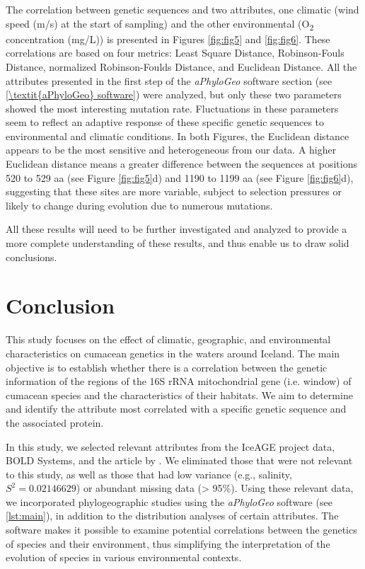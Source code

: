 The correlation between genetic sequences and two attributes, one climatic (wind speed (m/s) at the start of sampling) and the other environmental (O\textsubscript{2} concentration (mg/L)) is presented in Figures \ref{fig:fig5} and \ref{fig:fig6}. These correlations are based on four metrics: Least Square Distance, Robinson-Fouls Distance, normalized Robinson-Foulds Distance, and Euclidean Distance. All the attributes presented in the first step of the \textit{aPhyloGeo} software section (see \ref{\textit{aPhyloGeo} software}) were analyzed, but only these two parameters showed the most interesting mutation rate. Fluctuations in these parameters seem to reflect an adaptive response of these specific genetic sequences to environmental and climatic conditions. In both Figures, the Euclidean distance appears to be the most sensitive and heterogeneous from our data. A higher Euclidean distance means a greater difference between the sequences at positions 520 to 529 aa (see Figure \ref{fig:fig5}d) and 1190 to 1199 aa (see Figure \ref{fig:fig6}d), suggesting that these sites are more variable, subject to selection pressures or likely to change during evolution due to numerous mutations. 

All these results will need to be further investigated and analyzed to provide a more complete understanding of these results, and thus enable us to draw solid conclusions.

\section{Conclusion}\label{conclusion}

This study focuses on the effect of climatic, geographic, and environmental characteristics on cumacean genetics in the waters around Iceland. The main objective is to establish whether there is a correlation between the genetic information of the regions of the 16S rRNA mitochondrial gene (i.e. window) of cumacean species and the characteristics of their habitats. We aim to determine and identify the attribute most correlated with a specific genetic sequence and the associated protein. 

In this study, we selected relevant attributes from the IceAGE project data, BOLD Systems, and the article by \citep{uhlir_adding_2021}. We eliminated those that were not relevant to this study, as well as those that had low variance (e.g., salinity, $S^2 = 0.02146629$) or abundant missing data (> 95\%). Using these relevant data, we incorporated phylogeographic studies using the \textit{aPhyloGeo} software (see \autoref{lst:main}), in addition to the distribution analyses of certain attributes. The software makes it possible to examine potential correlations between the genetics of species and their environment, thus simplifying the interpretation of the evolution of species in various environmental contexts.

